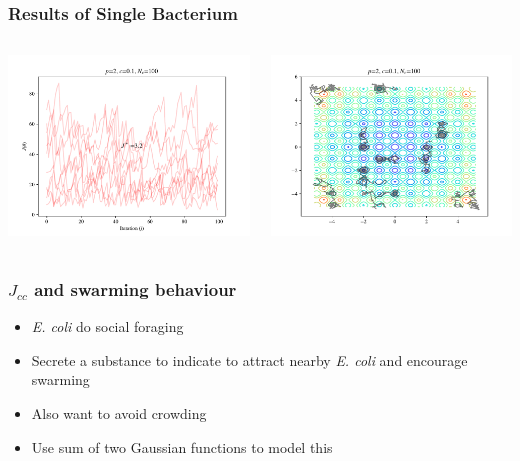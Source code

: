 \documentclass{beamer}
\begin{document}
\begin{frame}
\frametitle{Results of Single Bacterium}
\begin{columns}[T]
    \begin{center}
      \includegraphics[scale=0.35]{assets/rastrigin_J}
    \end{center}
  \begin{center}
    \includegraphics[scale=0.35]{assets/rastrigin_theta}
  \end{center}
\end{columns}
\end{frame}

\begin{frame}
\frametitle{$J_{cc}$ and swarming behaviour}
\begin{itemize}
  \item \textit{E. coli} do social foraging
  \item Secrete a substance to indicate to attract nearby \textit{E. coli} and encourage swarming
  \item Also want to avoid crowding
  \item Use sum of two Gaussian functions to model this
\end{itemize}
\end{frame}
\end{document}
